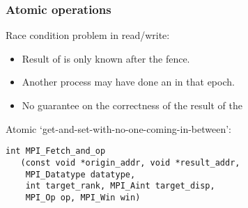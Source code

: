 \begin{frame}[containsverbatim]\frametitle{Atomic operations}
  Race condition problem in read/write:
  \begin{itemize}
  \item Result of  is only known after the fence.
  \item Another process may have done an  in that epoch.
  \item No guarantee on the correctness of the result of the 
  \end{itemize}

  Atomic `get-and-set-with-no-one-coming-in-between':
\lstset{language=C}
\begin{lstlisting}
int MPI_Fetch_and_op
   (const void *origin_addr, void *result_addr,
    MPI_Datatype datatype,
    int target_rank, MPI_Aint target_disp,
    MPI_Op op, MPI_Win win)
\end{lstlisting}
\end{frame}


\begin{optexerciseframe}
  
\end{optexerciseframe}

\endinput

\begin{frame}[containsverbatim]\frametitle{}
\begin{lstlisting}
  
\end{lstlisting}
\end{frame}

